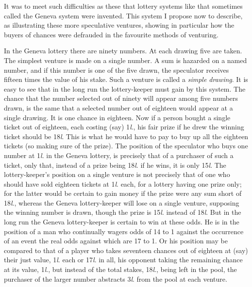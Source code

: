 \documentclass[letterpaper,12pt,oneside,openany]{memoir}
\begin{document}
It was to meet such difficulties as these that lottery
systems like that sometimes called the Geneva system
were invented. This system I propose now to describe,
as illustrating these more speculative ventures, showing
in particular how the buyers of chances were defrauded
in the favourite methods of venturing.

In the Geneva lottery there are ninety numbers. At
each drawing five are taken. The simplest venture is
made on a single number. A sum is hazarded on a
named number, and if this number is one of the five
drawn, the speculator receives fifteen times the value of
his stake. Such a venture is called a \textit{simple drawing}.
It is easy to see that in the long run the lottery-keeper
must gain by this system. The chance that the number
selected out of ninety will appear among five numbers
drawn, is the same that a selected number out of
eighteen would appear at a single drawing. It is one
chance in eighteen. Now if a person bought a single
ticket out of eighteen, each costing (say) 1\textit{l}., his fair
prize if he drew the winning ticket should be 18\textit{l}. This
is what he would have to pay to buy up all the eighteen
tickets (so making sure of the prize). The position of
the speculator who buys one number at 1\textit{l}. in the Geneva
lottery, is precisely that of a purchaser of such a ticket,
only that, instead of a prize being 18\textit{l}. if he wins, it is
only 15\textit{l}. The lottery-keeper's position on a single
venture is not precisely that of one who should have
sold eighteen tickets at 1\textit{l}. each, for a lottery having one
prize only; for the latter would be certain to gain money
if the prize were any sum short of 18\textit{l}., whereas the
Geneva lottery-keeper will lose on a single venture,
supposing the winning number is drawn, though the
prize is 15\textit{l}. instead of 18\textit{l}. But in the long run the
Geneva lottery-keeper is certain to win at these odds.
He is in the position of a man who continually wagers
odds of 14 to 1 against the occurrence of an event the
real odds against which are 17 to 1. Or his position
may be compared to that of a player who takes seventeen
chances out of eighteen at (say) their just value, 1\textit{l}. each
or 17\textit{l}. in all, his opponent taking the remaining chance
at its value, 1\textit{l}., but instead of the total stakes, 18\textit{l}.,
being left in the pool, the purchaser of the larger
number abstracts 3\textit{l}. from the pool at each venture.
\end{document}
